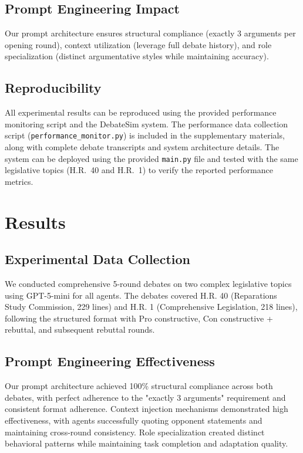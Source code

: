 \documentclass{article}
\begin{document}
\subsection{Prompt Engineering Impact}

Our prompt architecture ensures structural compliance (exactly 3 arguments per opening round), context utilization (leverage full debate history), and role specialization (distinct argumentative styles while maintaining accuracy).

\subsection{Reproducibility}

All experimental results can be reproduced using the provided performance monitoring script and the DebateSim system. The performance data collection script (\texttt{performance\_monitor.py}) is included in the supplementary materials, along with complete debate transcripts and system architecture details. The system can be deployed using the provided \texttt{main.py} file and tested with the same legislative topics (H.R.~40 and H.R.~1) to verify the reported performance metrics.

\section{Results}

\subsection{Experimental Data Collection}

We conducted comprehensive 5-round debates on two complex legislative topics using GPT-5-mini for all agents. The debates covered H.R. 40 (Reparations Study Commission, 229 lines) and H.R. 1 (Comprehensive Legislation, 218 lines), following the structured format with Pro constructive, Con constructive + rebuttal, and subsequent rebuttal rounds.

\subsection{Prompt Engineering Effectiveness}

Our prompt architecture achieved 100\% structural compliance across both debates, with perfect adherence to the "exactly 3 arguments" requirement and consistent format adherence. Context injection mechanisms demonstrated high effectiveness, with agents successfully quoting opponent statements and maintaining cross-round consistency. Role specialization created distinct behavioral patterns while maintaining task completion and adaptation quality.
\end{document}
